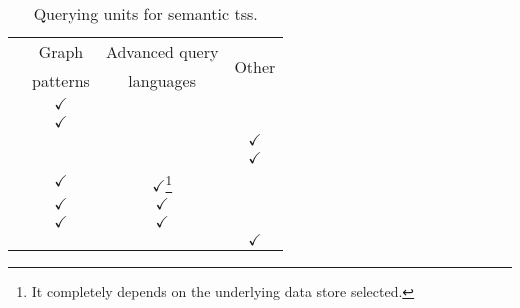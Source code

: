 \begin{savenotes}
  \begin{table}[htbp]
    \caption{Querying units for semantic \ac{ts}s.}
    \centering
    \begin{tabular}{l c c c}
      \hline 
	& Graph  & Advanced query  & \multirow{2}{*}{Other} \\
	& patterns  & languages  & ~ \\
      \hline
      \midtsc{} & $\checkmark$ & & \\ %
      \midsws{} & $\checkmark$ & & \\
      \midstuples{} & & & $\checkmark$ \\
      \midcspaces{} & & & $\checkmark$ \\ %
      \midtscpp{} & $\checkmark$ & $\checkmark$\footnote{It completely depends on the underlying data store selected.} & \\ %
      \midtripcom{} & $\checkmark$ & $\checkmark$ & \\
      \midsmartmt{} & $\checkmark$ & $\checkmark$ & \\
      \midnardini{} & & & $\checkmark$ \\
      \hline
    \end{tabular}
    \label{tab:query_comparison}
  \end{table}
\end{savenotes}

